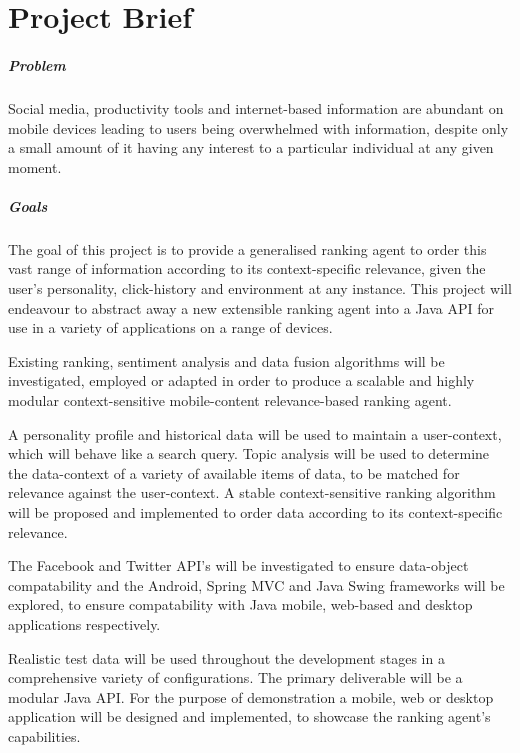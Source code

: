 \chapter{Project Brief}\label{projectBrief}

\paragraph{Problem}
Social media, productivity tools and internet-based information are abundant on mobile devices leading to users being overwhelmed with information, despite only a small amount of it having any interest to a particular individual at any given moment.

\paragraph{Goals}
The goal of this project is to provide a generalised ranking agent to order this vast range of information according to its context-specific relevance, given the user's personality, click-history and environment at any instance. This project will endeavour to abstract away a new extensible ranking agent into a Java API for use in a variety of applications on a range of devices.

Existing ranking, sentiment analysis and data fusion algorithms will be investigated, employed or adapted in order to produce a scalable and highly modular context-sensitive mobile-content relevance-based ranking agent.

 A personality profile and historical data will be used to maintain a user-context, which will behave like a search query. Topic analysis will be used to determine the data-context of a variety of available items of data, to be matched for relevance against the user-context. A stable context-sensitive ranking algorithm will be proposed and implemented to order data according to its context-specific relevance.

The Facebook and Twitter API's will be investigated to ensure data-object compatability and the Android, Spring MVC and Java Swing frameworks will be explored, to ensure compatability with Java mobile, web-based and desktop applications respectively. 

Realistic test data will be used throughout the development stages in a comprehensive variety of configurations. 
The primary deliverable will be a modular Java API. For the purpose of demonstration a mobile, web or desktop application will be designed and implemented, to showcase the ranking agent's capabilities. 


